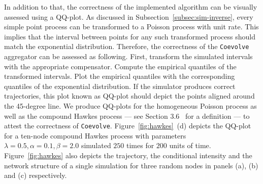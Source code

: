 \documentclass{juliacon}
\begin{document}
In addition to that, the correctness of the implemented algorithm can be visually assessed using a QQ-plot. As discussed in Subsection~\ref{subsec:sim-inverse}, every simple point process can be transformed to a Poisson process with unit rate. This implies that the interval between points for any such transformed process should match the exponential distribution. Therefore, the correctness of the \texttt{Coevolve} aggregator can be assessed as following. First, transform the simulated intervals with the appropriate compensator. Compute the empirical quantiles of the transformed intervals. Plot the empirical quantiles with the corresponding quantiles of the exponential distribution. If the simulator produces correct trajectories, this plot known as QQ-plot should depict the points aligned around the 45-degree line. We produce QQ-plots for the homogeneous Poisson process as well as the compound Hawkes process --- see Section 3.6~\cite{laub2021} for a definition --- to attest the correctness of \texttt{Coevolve}. Figure~\ref{fig:hawkes}~(d) depicts the QQ-plot for a ten-node compound Hawkes process with parameters \( \lambda = 0.5 , \alpha = 0.1 , \beta = 2.0 \) simulated \( 250 \) times for \( 200 \) units of time. Figure~\ref{fig:hawkes} also depicts the trajectory, the conditional intensity and the network structure of a single simulation for three random nodes in panels (a), (b) and (c) respectively.
\end{document}
